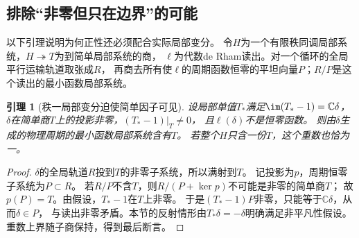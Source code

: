 \documentclass[11pt,a4paper]{ctexart}
\theoremstyle{cnplain}\newtheorem{theorem}{定理}[section]
\newtheorem{lemma}[theorem]{引理}
\theoremstyle{definition}\newtheorem{definition}[theorem]{定义}
\theoremstyle{remark}\newtheorem{remark}[theorem]{注}
\begin{document}
\subsection{排除“非零但只在边界”的可能}
以下引理说明为何正性还必须配合实际局部变分。
令$H$为一个有限秩同调局部系统，$H\twoheadrightarrow T$为到简单局部系统的商，
$\ell$为代数de Rham读出。对一个循环的全局平行运输轨道取张成$R$，
再商去所有使$\ell$的周期函数恒零的平坦向量$P$；$R/P$是这个读出的最小函数局部系统。

\begin{lemma}[秩一局部变分迫使简单因子可见]\label{lem:evenvisibility}
设局部单值$T_*$满足$\im(T_*-1)=\mathbb C\delta$，
$\delta$在简单商$T$上的投影非零，$(T_*-1)|_T\ne0$，
且$\ell(\delta)$不是恒零函数。
则由$\delta$生成的物理周期的最小函数局部系统含有$T$。
若整个$H$只含一份$T$，这个重数也恰为一。
\end{lemma}
\begin{proof}
$\delta$的全局轨道$R$投到$T$的非零子系统，所以满射到$T$。
记投影为$p$，周期恒零子系统为$P\subset R$。
若$R/P$不含$T$，则$R/(P+\ker p)$不可能是非零的简单商$T$；
故$p(P)=T$。由假设，$T_*-1$在$T$上非零。
于是$(T_*-1)P$非零，只能等于$\mathbb C\delta$，从而$\delta\in P$，
与读出非零矛盾。本节的反射情形由$T_*\delta=-\delta$明确满足非平凡性假设。
重数上界随子商保持，得到最后断言。
\end{proof}
\end{document}
